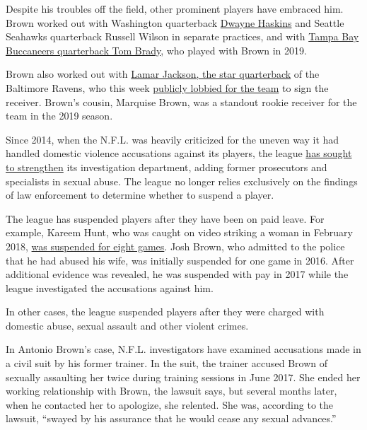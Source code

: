 Despite his troubles off the field, other prominent players have
embraced him. Brown worked out with Washington quarterback
\href{https://www.nbcsports.com/washington/redskins/video-dwayne-haskins-connects-antonio-brown-over-and-over-offseason-workout}{Dwayne
Haskins} and Seattle Seahawks quarterback Russell Wilson in separate
practices, and with
\href{https://sports.yahoo.com/tom-brady-and-antonio-brown-are-working-out-with-deion-sanders-son-181014120.html}{Tampa
Bay Buccaneers quarterback Tom Brady}, who played with Brown in 2019.

Brown also worked out with
\href{https://www.youtube.com/watch?v=pOJtVpB1Vq0}{Lamar Jackson, the
star quarterback} of the Baltimore Ravens, who this week
\href{https://www.espn.com/nfl/story/_/id/29559051/lamar-jackson-says-hoping-ravens-sign-antonio-brown}{publicly
lobbied for the team} to sign the receiver. Brown's cousin, Marquise
Brown, was a standout rookie receiver for the team in the 2019 season.

Since 2014, when the N.F.L. was heavily criticized for the uneven way it
had handled domestic violence accusations against its players, the
league
\href{https://www.nytimes.com/2014/08/29/sports/football/roger-goodell-admits-he-was-wrong-and-alters-nfl-policy-on-domestic-violence.html}{has
sought to strengthen} its investigation department, adding former
prosecutors and specialists in sexual abuse. The league no longer relies
exclusively on the findings of law enforcement to determine whether to
suspend a player.

The league has suspended players after they have been on paid leave. For
example, Kareem Hunt, who was caught on video striking a woman in
February 2018,
\href{https://www.nytimes.com/2019/03/15/sports/football/kareem-hunt-.html}{was
suspended for eight games}. Josh Brown, who admitted to the police that
he had abused his wife, was initially suspended for one game in 2016.
After additional evidence was revealed, he was suspended with pay in
2017 while the league investigated the accusations against him.

In other cases, the league suspended players after they were charged
with domestic abuse, sexual assault and other violent crimes.

In Antonio Brown's case, N.F.L. investigators have examined accusations
made in a civil suit by his former trainer. In the suit, the trainer
accused Brown of sexually assaulting her twice during training sessions
in June 2017. She ended her working relationship with Brown, the lawsuit
says, but several months later, when he contacted her to apologize, she
relented. She was, according to the lawsuit, ``swayed by his assurance
that he would cease any sexual advances.''

